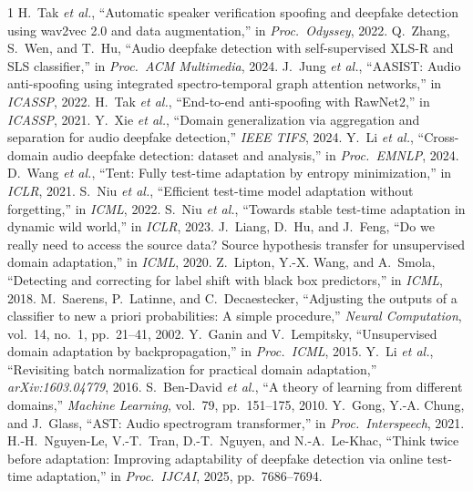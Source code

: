\documentclass[conference]{IEEEtran}
\begin{document}
{\small
\begin{thebibliography}{1}
\small
{} H.~Tak \emph{et al.}, ``Automatic speaker verification
spoofing and deepfake detection using wav2vec 2.0 and data augmentation,'' in
\emph{Proc.\ Odyssey}, 2022.
 Q.~Zhang, S.~Wen, and T.~Hu, ``Audio deepfake detection with
self-supervised XLS-R and SLS classifier,'' in \emph{Proc.\ ACM Multimedia},
2024.
 J.~Jung \emph{et al.}, ``AASIST: Audio anti-spoofing using
integrated spectro-temporal graph attention networks,'' in \emph{ICASSP}, 2022.
 H.~Tak \emph{et al.}, ``End-to-end anti-spoofing with RawNet2,''
in \emph{ICASSP}, 2021.
 Y.~Xie \emph{et al.}, ``Domain generalization via aggregation and
separation for audio deepfake detection,'' \emph{IEEE TIFS}, 2024.
 Y.~Li \emph{et al.}, ``Cross-domain audio deepfake
detection: dataset and analysis,'' in \emph{Proc.\ EMNLP}, 2024.
 D.~Wang \emph{et al.}, ``Tent: Fully test-time adaptation by
entropy minimization,'' in \emph{ICLR}, 2021.
 S.~Niu \emph{et al.}, ``Efficient test-time model adaptation
without forgetting,'' in \emph{ICML}, 2022.
 S.~Niu \emph{et al.}, ``Towards stable test-time adaptation in
dynamic wild world,'' in \emph{ICLR}, 2023.
 J.~Liang, D.~Hu, and J.~Feng, ``Do we really need to access the
source data? Source hypothesis transfer for unsupervised domain adaptation,''
in \emph{ICML}, 2020.
 Z.~Lipton, Y.-X. Wang, and A.~Smola, ``Detecting and correcting
for label shift with black box predictors,'' in \emph{ICML}, 2018.
 M.~Saerens, P.~Latinne, and C.~Decaestecker, ``Adjusting the
outputs of a classifier to new a priori probabilities: A simple procedure,''
\emph{Neural Computation}, vol.\ 14, no.\ 1, pp.\ 21--41, 2002.
 Y.~Ganin and V.~Lempitsky, ``Unsupervised domain adaptation by
backpropagation,'' in \emph{Proc.\ ICML}, 2015.
 Y.~Li \emph{et al.}, ``Revisiting batch normalization for
practical domain adaptation,'' \emph{arXiv:1603.04779}, 2016.
 S.~Ben-David \emph{et al.}, ``A theory of learning from
different domains,'' \emph{Machine Learning}, vol.\ 79, pp.\ 151--175, 2010.
 Y.~Gong, Y.-A. Chung, and J.~Glass, ``AST: Audio spectrogram
transformer,'' in \emph{Proc.\ Interspeech}, 2021.
 H.-H.~Nguyen-Le, V.-T.~Tran, D.-T.~Nguyen, and N.-A.~Le-Khac,
``Think twice before adaptation: Improving adaptability of deepfake detection
via online test-time adaptation,'' in \emph{Proc.\ IJCAI}, 2025, pp.\ 7686--7694.

\end{thebibliography}}
\end{document}
